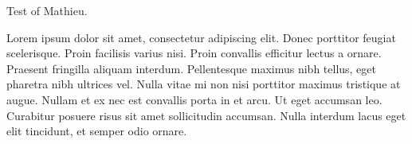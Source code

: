 Test of Mathieu.

Lorem ipsum dolor sit amet, 
consectetur adipiscing elit. 
Donec porttitor feugiat scelerisque. 
Proin facilisis varius nisi. 
Proin convallis efficitur lectus a ornare. 
Praesent fringilla aliquam interdum. 
Pellentesque maximus nibh tellus, eget pharetra nibh ultrices vel. 
Nulla vitae mi non nisi porttitor maximus tristique at augue. 
Nullam et ex nec est convallis porta in et arcu. 
Ut eget accumsan leo. 
Curabitur posuere risus sit amet sollicitudin accumsan. 
Nulla interdum lacus eget elit tincidunt, et semper odio ornare.
